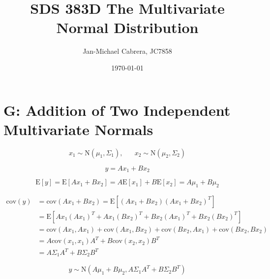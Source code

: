 \documentclass[12pt]{article}
\newcommand{\cov}{\text{cov}}
\newcommand{\E}{\text{E}}
\begin{document}
    \title{SDS 383D The Multivariate Normal Distribution}
    \author{Jan-Michael Cabrera, JC7858}
    \date{\today}
    \maketitle

    \section*{G: Addition of Two Independent Multivariate Normals}

        \begin{equation}
            x_1 \sim \text{N}(\mu_1, \Sigma_1), \hspace{20pt} x_2 \sim \text{N}(\mu_2, \Sigma_2)
        \end{equation}

        \begin{equation}
            y = A x_1 + B x_2
        \end{equation}

        \begin{equation}
            \E[y] = \E[A x_1 + B x_2] = A \E[x_1] + B\E[x_2] = A \mu_1 + B \mu_2
        \end{equation}

        \begin{align}
            \cov(y) &= \cov(Ax_1 + Bx_2) = \E[(Ax_1 + Bx_2)(A x_1 + B x_2)^T] \\
            &= \E[ Ax_1(Ax_1)^T + Ax_1 (Bx_2)^T + Bx_2 (Ax_1)^T + Bx_2 (Bx_2)^T]\\
            &= \cov(Ax_1, Ax_1) + \cov(Ax_1, Bx_2) + \cov(Bx_2, Ax_1) + \cov(Bx_2, Bx_2)\\
            &= A\cov(x_1, x_1)A^T + B \cov(x_2, x_2)B^T \\
            &= A \Sigma_1 A^T + B \Sigma_2 B^T
        \end{align}

        \begin{equation}
            y \sim \text{N}(A \mu_1 + B \mu_2, A \Sigma_1 A^T + B \Sigma_2 B^T)
        \end{equation}
\end{document}
